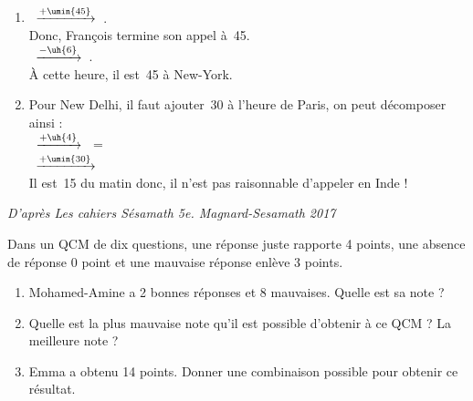\begin{colonne*exercice}
\begin{corrige}
   \ \\ [-5mm]
   \begin{enumerate}
      \item {}\, \quad $\xrightarrow{+\umin{45}}$ \quad {}\,. \\
         Donc, François termine son appel à \,45. \\ [1mm]
         \, \quad $\xrightarrow{-\uh{6}}$ \quad {}\,. \\
         À cette heure, il est {\blue {}\,45} à New-York.
      \item Pour New Delhi, il faut ajouter \,30 à l'heure de Paris, on peut décomposer ainsi : \\ [1mm]
         \, \quad $\xrightarrow{+\uh{4}}$ \quad {}\, = \,\\ [1mm]
         \, \quad $\xrightarrow{+\umin{30}}$ \quad {}\, \\ [1mm]
         Il est \,15 du matin donc, {\blue il n'est pas raisonnable d'appeler en Inde !}
   \end{enumerate}
\end{corrige}

\vfill\hfill{\footnotesize\it D'après Les cahiers Sésamath 5e. Magnard-Sesamath 2017}


\begin{exercice} %
   Dans un QCM de dix questions, une réponse juste rapporte 4 points, une absence de réponse 0 point et une mauvaise réponse enlève 3 points.
   \begin{enumerate}
      \item Mohamed-Amine a 2 bonnes réponses et 8 mauvaises. Quelle est sa note ?
      \item Quelle est la plus mauvaise note qu'il est possible d'obtenir à ce QCM ? La meilleure note ?
      \item Emma a obtenu 14 points. Donner une combinaison possible pour obtenir ce résultat.
   \end{enumerate}
\end{exercice}


\end{colonne*exercice}

